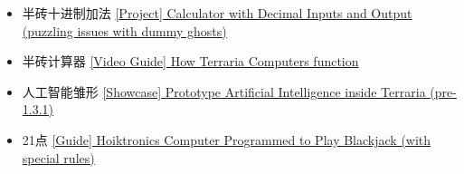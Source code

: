 \begin{itemize}
\item 半砖十进制加法 \href{https://forums.terraria.org/index.php?threads/project-calculator-with-decimal-inputs-and-output-puzzling-issues-with-dummy-ghosts.75906/}{[Project] Calculator with Decimal Inputs and Output (puzzling issues with dummy ghosts)}
\item 半砖计算器 \href{https://forums.terraria.org/index.php?threads/video-guide-how-terraria-computers-function.75928/}{[Video Guide] How Terraria Computers function}
\item 人工智能雏形 \href{https://forums.terraria.org/index.php?threads/showcase-prototype-artificial-intelligence-inside-terraria-pre-1-3-1.75890/}{[Showcase] Prototype Artificial Intelligence inside Terraria (pre-1.3.1)}
\item 21点 \href{https://forums.terraria.org/index.php?threads/guide-hoiktronics-computer-programmed-to-play-blackjack-with-special-rules.75914/}{[Guide] Hoiktronics Computer Programmed to Play Blackjack (with special rules)}
\end{itemize}


